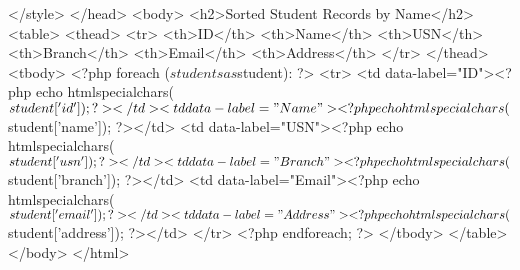     </style>
</head>
<body>
    <h2>Sorted Student Records by Name</h2>
    <table>
        <thead>
            <tr>
                <th>ID</th>
                <th>Name</th>
                <th>USN</th>
                <th>Branch</th>
                <th>Email</th>
                <th>Address</th>
            </tr>
        </thead>
        <tbody>
            <?php foreach ($students as $student): ?>
                <tr>
                    <td data-label="ID"><?php echo htmlspecialchars($student['id']); ?></td>
                    <td data-label="Name"><?php echo htmlspecialchars($student['name']); ?></td>
                    <td data-label="USN"><?php echo htmlspecialchars($student['usn']); ?></td>
                    <td data-label="Branch"><?php echo htmlspecialchars($student['branch']); ?></td>
                    <td data-label="Email"><?php echo htmlspecialchars($student['email']); ?></td>
                    <td data-label="Address"><?php echo htmlspecialchars($student['address']); ?></td>
                </tr>
            <?php endforeach; ?>
        </tbody>
    </table>
</body>
</html>
